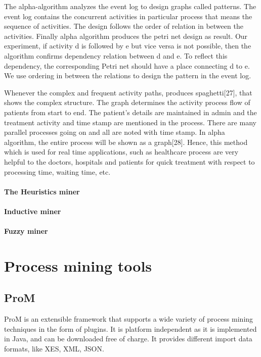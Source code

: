 The alpha-algorithm analyzes the event log to design graphs called patterns. The event log contains the concurrent activities in particular process that means the sequence of activities. The design follows the order of relation in between the activities. Finally alpha algorithm produces the petri net design as result. Our experiment, if activity d is followed by e but vice versa is not possible, then the algorithm confirms dependency relation between d and e. To reflect this dependency, the corresponding Petri net should have a place connecting d to e. We use ordering in between the relations to design the pattern in the event log.

Whenever the complex and frequent activity paths, produces spaghetti[27], that shows the complex structure. The graph determines the activity process flow of patients from start to end. The patient’s details are maintained in admin and the treatment activity and time stamp are mentioned in the process. There are many parallel processes going on and all are noted with time stamp. In alpha algorithm, the entire process will be shown as a graph[28]. Hence, this method which is used for real time applications, such as healthcare process are very helpful to the doctors, hospitals and patients for quick treatment with respect to processing time, waiting time, etc.

\paragraph{The Heuristics miner}
\paragraph{Inductive miner}
\paragraph{Fuzzy miner}






\section{Process mining tools}
\subsection{ProM}
ProM is an extensible framework that supports a wide variety of process mining techniques in the form of plugins. 
It is platform independent as it is implemented in Java, and can be downloaded free of charge. It provides different import data formats, like XES, XML, JSON.
